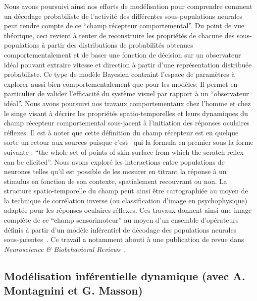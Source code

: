 \documentclass[11pt,french,a4paper,oneside]{article}%
\begin{document}
Nous avons poursuivi ainsi nos efforts de modélisation pour comprendre comment un décodage probabiliste de l'activité des différentes sous-populations neurales peut rendre compte de ce ``champ récepteur comportemental''. Du point de vue théorique, ceci revient à tenter de reconstruire les propriétés de chacune des sous-populations à partir des distributions de probabilités obtenues comportementalement et de baser une fonction de décision sur un observateur idéal pouvant extraire vitesse et direction à partir d'une représentation distribuée probabiliste. Ce type de modèle Bayesien contraint l'espace de paramètres à explorer aussi bien comportementalement que pour les modèles: Il permet en particulier de valider l'efficacité du système visuel par rapport à un ``observateur idéal''. Nous avons poursuivi nos travaux comportementaux chez l'homme et chez le singe visant à décrire les propriétés spatio-temporelles et leurs dynamiques du champ récepteur comportemental sous-jacent à l'initiation des réponses oculaires réflexes. Il est à noter que cette définition du champ récepteur est en quelque sorte un retour aux sources puisque c'est~\citet{Sherrington06} qui la formula en premier sous la forme suivante : ``the whole set of points of skin surface from which the scratch-reflex can be elicited''. Nous avons exploré les interactions entre populations de neurones telles qu'il est possible de les mesurer en titrant la réponse à un stimulus en fonction de son contexte, spatialement recouvrant ou non. La structure spatio-temporelle du champ peut ainsi être cartographiée au moyen de la technique de corrélation inverse (ou classification d'image en psychophysique) adaptée pour les réponses oculaires réflexes. Ces travaux donnent ainsi une image complète de ce ``champ sensorimoteur'' au moyen d'un ensemble d'opérateurs définis à partir d'un modèle inférentiel de décodage des populations neurales sous-jacentes~\citep{Perrinet05a,Perrinet06neurocomp,Perrinet07neurocomp,Perrinet08areadne,Perrinet09cosyne}. Ce travail a notamment abouti à une publication de revue dans \emph{Neuroscience \& Biobehavioral Reviews}~\citep{Masson12}.

\subsection{Modélisation inférentielle dynamique (avec A. Montagnini et G. Masson)}
\end{document}
